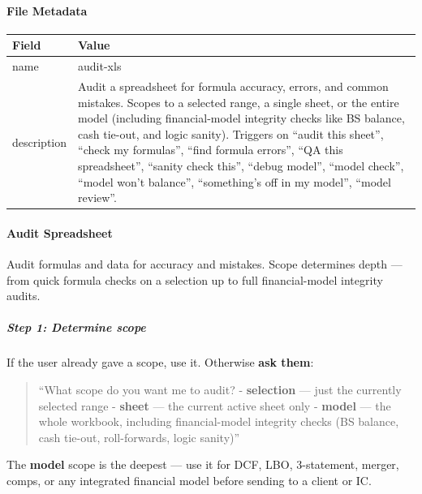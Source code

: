 \documentclass[11pt]{article}
\begin{document}
\paragraph{File Metadata}\mbox{}\par
\begingroup
\small
\setlength{\tabcolsep}{2pt}
\begin{longtable}{>{\RaggedRight\arraybackslash\hspace{0pt}}p{}>{\RaggedRight\arraybackslash\hspace{0pt}}p{}}
\toprule
{} \textbf{Field} & \textbf{Value} \\
\midrule
{} name & audit-xls \\
{} description & Audit a spreadsheet for formula accuracy, errors, and common mistakes. Scopes to a selected range, a single sheet, or the entire model (including financial-model integrity checks like BS balance, cash tie-out, and logic sanity). Triggers on ``audit this sheet'', ``check my formulas'', ``find formula errors'', ``QA this spreadsheet'', ``sanity check this'', ``debug model'', ``model check'', ``model won't balance'', ``something's off in my model'', ``model review''. \\
\bottomrule
\end{longtable}
\endgroup


\paragraph{Audit Spreadsheet}\mbox{}\par

Audit formulas and data for accuracy and mistakes. Scope determines depth — from quick formula checks on a selection up to full financial-model integrity audits.


\subparagraph{Step 1: Determine scope}\mbox{}\par

If the user already gave a scope, use it. Otherwise \textbf{ask them}:


\begin{quote}
``What scope do you want me to audit? - \textbf{selection} — just the currently selected range - \textbf{sheet} — the current active sheet only - \textbf{model} — the whole workbook, including financial-model integrity checks (BS balance, cash tie-out, roll-forwards, logic sanity)''
\end{quote}

The \textbf{model} scope is the deepest — use it for DCF, LBO, 3-statement, merger, comps, or any integrated financial model before sending to a client or IC.
\end{document}
